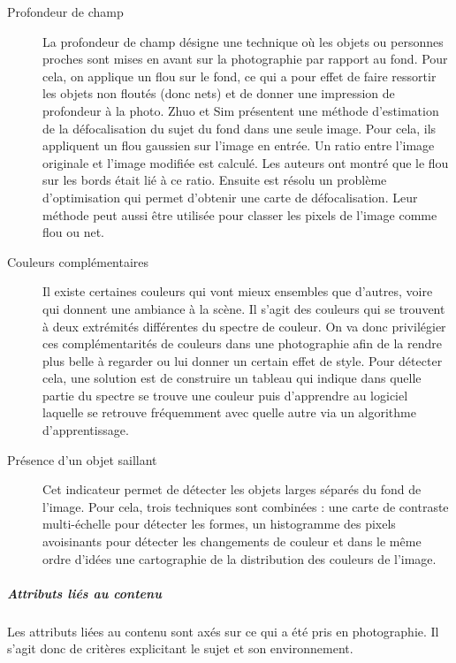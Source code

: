 \documentclass[11pt, french,screen]{report-rd-info}
\begin{document}
\begin{description}
\item[Profondeur de champ]
La profondeur de champ désigne une technique où les objets ou personnes proches sont mises en avant sur la photographie par rapport au fond. Pour cela, on applique un flou sur  le fond, ce qui a pour effet de faire ressortir les objets non floutés (donc nets) et de donner une impression de profondeur à la photo. Zhuo et Sim \cite{Zhuo2011} présentent une méthode d’estimation de la défocalisation du sujet du fond dans une seule image. Pour cela, ils appliquent un flou gaussien sur l’image en  entrée. Un ratio entre l’image originale et l’image modifiée est calculé. Les auteurs ont montré que le flou sur les bords était lié à ce ratio. Ensuite est résolu un problème d’optimisation qui permet d’obtenir une carte de défocalisation. Leur méthode peut aussi être utilisée pour classer les pixels de l’image comme flou ou net.
\item[Couleurs complémentaires]
Il existe certaines couleurs qui vont mieux ensembles que d’autres, voire qui donnent une ambiance à la scène. Il s’agit des couleurs qui se trouvent à deux extrémités différentes du spectre de couleur. On va donc privilégier ces complémentarités de couleurs dans une photographie afin de la rendre plus belle à regarder ou lui donner un certain effet de style. Pour détecter cela, une solution est de construire un tableau  qui indique dans quelle partie du spectre se trouve une couleur puis d’apprendre au logiciel laquelle se retrouve fréquemment  avec quelle autre via un algorithme d’apprentissage.
\item[Présence d'un objet saillant]
Cet indicateur permet de détecter les objets larges séparés du fond de l’image. Pour cela, trois techniques sont combinées : une carte de contraste multi-échelle pour détecter les formes, un histogramme des pixels avoisinants pour détecter les changements de couleur et dans le même ordre d’idées une cartographie de la distribution des couleurs de l’image.
\end{description}
\subparagraph{Attributs liés au contenu}
Les attributs liées au contenu sont axés sur ce qui a été pris en photographie. Il s'agit donc de critères explicitant le sujet et son environnement.
\end{document}

